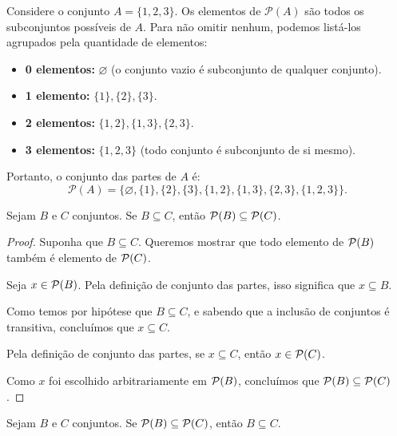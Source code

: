 \begin{exemplo}[\(\mathcal{P}(\{1,2,3\})\)]
    Considere o conjunto \(A = \{1, 2, 3\}\). Os elementos de \(\mathcal{P}(A)\) são todos os subconjuntos possíveis de \(A\). Para não omitir nenhum, podemos listá-los agrupados pela quantidade de elementos:
    \begin{itemize}
        \item \textbf{0 elementos:} \(\varnothing\) (o conjunto vazio é subconjunto de qualquer conjunto).
        \item \textbf{1 elemento:} \(\{1\}, \{2\}, \{3\}\).
        \item \textbf{2 elementos:} \(\{1, 2\}, \{1, 3\}, \{2, 3\}\).
        \item \textbf{3 elementos:} \(\{1, 2, 3\}\) (todo conjunto é subconjunto de si mesmo).
    \end{itemize}
    Portanto, o conjunto das partes de \(A\) é:
    \[
        \mathcal{P}(A) = \{\varnothing, \{1\}, \{2\}, \{3\}, \{1, 2\}, \{1, 3\}, \{2, 3\}, \{1, 2, 3\}\}.
    \]
\end{exemplo}

\begin{proposicao}
    \label{prop:powerset_contido}
    Sejam \(B\) e \(C\) conjuntos. Se \(B \subseteq C\), então \(\mathcal{P}(B) \subseteq \mathcal{P}(C)\).
\end{proposicao}

\begin{proof}
    Suponha que \(B \subseteq C\). Queremos mostrar que todo elemento de \(\mathcal{P}(B)\) também é elemento de \(\mathcal{P}(C)\).

    Seja \(x \in \mathcal{P}(B)\). Pela definição de conjunto das partes, isso significa que \(x \subseteq B\).

    Como temos por hipótese que \(B \subseteq C\), e sabendo que a inclusão de conjuntos é transitiva, concluímos que \(x \subseteq C\).

    Pela definição de conjunto das partes, se \(x \subseteq C\), então \(x \in \mathcal{P}(C)\).

    Como \(x\) foi escolhido arbitrariamente em \(\mathcal{P}(B)\), concluímos que \(\mathcal{P}(B) \subseteq \mathcal{P}(C)\).
\end{proof}

\begin{proposicao}
    \label{prop:reciproca_powerset_contido}
    Sejam \(B\) e \(C\) conjuntos. Se \(\mathcal{P}(B) \subseteq \mathcal{P}(C)\), então \(B \subseteq C\).
\end{proposicao}

